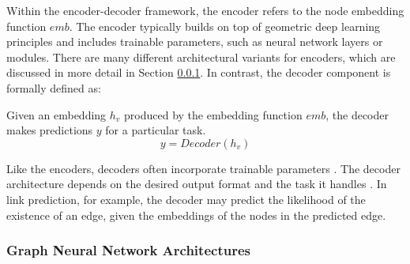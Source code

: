 

Within the encoder-decoder framework, the encoder refers to the node embedding function $emb$. The encoder typically builds on top of geometric deep learning principles and includes trainable parameters, such as neural network layers or modules. There are many different architectural variants for encoders, which are discussed in more detail in Section \ref{s_Background_GNNs_GNNArchtectures}. In contrast, the decoder component is formally defined as:

\begin{definition}
    \label{d_Decoder}
    Given an embedding $h_v$ produced by the embedding function $emb$, the decoder makes predictions $y$ for a particular task.
    \begin{equation}
        y = Decoder(h_v)
    \end{equation}
\end{definition}

Like the encoders, decoders often incorporate trainable parameters \cite{hamilton_representation_2017}. The decoder architecture depends on the desired output format and the task it handles \cite{hamilton_representation_2017}. In link prediction, for example, the decoder may predict the likelihood of the existence of an edge, given the embeddings of the nodes in the predicted edge.

\subsubsection{Graph Neural Network Architectures}
\label{s_Background_GNNs_GNNArchtectures}

